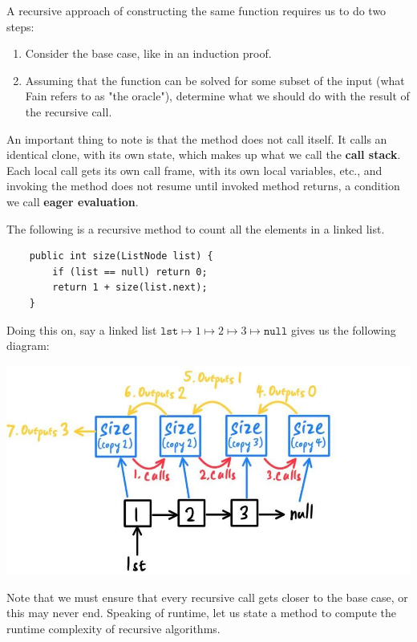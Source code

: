 \documentclass{article}
\begin{document}
    A recursive approach of constructing the same function requires us to do two steps: 
    \begin{enumerate}
        \item Consider the base case, like in an induction proof. 
        \item Assuming that the function can be solved for some subset of the input (what Fain refers to as "the oracle"), determine what we should do with the result of the recursive call. 
    \end{enumerate}
    An important thing to note is that the method does not call itself. It calls an identical clone, with its own state, which makes up what we call the \textbf{call stack}. Each local call gets its own call frame, with its own local variables, etc., and invoking the method does not resume until invoked method returns, a condition we call \textbf{eager evaluation}. 

    \begin{example}[Recursion]
    The following is a recursive method to count all the elements in a linked list. 
    \begin{lstlisting}
    public int size(ListNode list) {
        if (list == null) return 0; 
        return 1 + size(list.next); 
    }
    \end{lstlisting}
    Doing this on, say a linked list $\texttt{lst} \mapsto 1 \mapsto 2 \mapsto 3 \mapsto \texttt{null}$ gives us the following diagram: 
    \begin{center}
        \includegraphics[scale=0.3]{img/size_recursion.jpg}
    \end{center}
    \end{example}

    Note that we must ensure that every recursive call gets closer to the base case, or this may never end. Speaking of runtime, let us state a method to compute the runtime complexity of recursive algorithms. 
\end{document}
